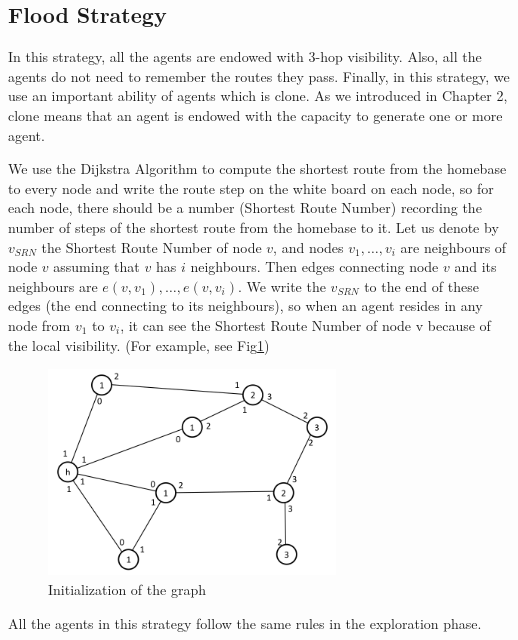 \subsection{Flood Strategy}
In this strategy, all the agents are endowed with 3-hop visibility. Also, all the agents do not need to remember the routes they pass. Finally, in this strategy, we use an important ability of agents which is clone. As we introduced in Chapter 2, clone means that an agent is endowed with the capacity to generate one or more agent. 

We use the Dijkstra Algorithm to compute the shortest route from the homebase to every node and write the route step on the white board on each node, so for each node, there should be a number (Shortest Route Number) recording the number of steps of the shortest route from the homebase to it. Let us denote by $v_{SRN}$ the Shortest Route Number of node $v$, and nodes ${v_1, \ldots, v_i}$ are neighbours of node $v$ assuming that $v$ has $i$ neighbours. Then edges connecting node $v$ and its neighbours are $e(v, v_1), \ldots, e(v, v_i)$. We write the $v_{SRN}$ to the end of these edges (the end connecting to its neighbours), so when an agent resides in any node from $v_1$ to $v_i$, it can see the Shortest Route Number of node v because of the local visibility. (For example, see Fig\ref{fig:Arbi1}) 

\begin{figure}[H]
  \centering  
  \includegraphics[width=3in]{figures/Arbi1.png}
  \caption{Initialization of the graph}\label{fig:Arbi1}
\end{figure}

All the agents in this strategy follow the same rules in the exploration phase.

